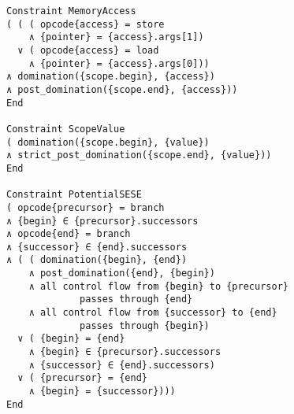 \begin{figure}[p]
\begin{lstlisting}[language=CAnDL,basicstyle=\linespread{0.8}\ttfamily,
                   firstnumber=195]
Constraint MemoryAccess
( ( ( opcode{access} = store
    ∧ {pointer} = {access}.args[1])
  ∨ ( opcode{access} = load
    ∧ {pointer} = {access}.args[0]))
∧ domination({scope.begin}, {access})
∧ post_domination({scope.end}, {access}))
End

Constraint ScopeValue
( domination({scope.begin}, {value})
∧ strict_post_domination({scope.end}, {value}))
End

Constraint PotentialSESE
( opcode{precursor} = branch
∧ {begin} ∈ {precursor}.successors
∧ opcode{end} = branch
∧ {successor} ∈ {end}.successors
∧ ( ( domination({begin}, {end})
    ∧ post_domination({end}, {begin})
    ∧ all control flow from {begin} to {precursor}
             passes through {end}
    ∧ all control flow from {successor} to {end}
             passes through {begin})
  ∨ ( {begin} = {end}
    ∧ {begin} ∈ {precursor}.successors
    ∧ {successor} ∈ {end}.successors)
  ∨ ( {precursor} = {end}
    ∧ {begin} = {successor})))
End
\end{lstlisting}
\end{figure}
